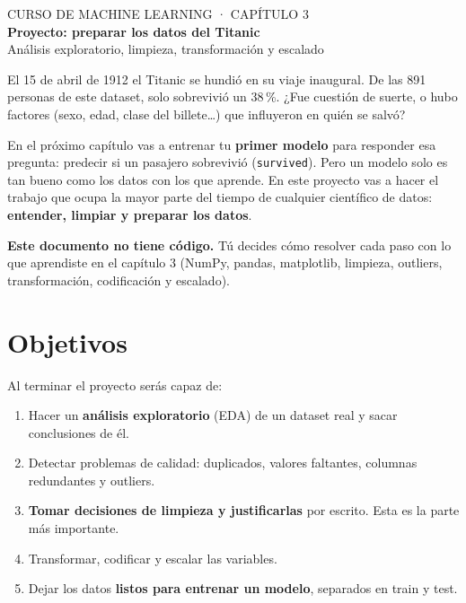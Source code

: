 \documentclass[11pt,a4paper]{article}
\newcommand{\col}[1]{\texttt{#1}}
\begin{document}
\begin{center}
  {\small\color{azul} CURSO DE MACHINE LEARNING · CAPÍTULO 3}\\[4pt]
  {\LARGE\bfseries Proyecto: preparar los datos del Titanic}\\[4pt]
  {\large Análisis exploratorio, limpieza, transformación y escalado}
\end{center}

\vspace{4pt}

El 15 de abril de 1912 el Titanic se hundió en su viaje inaugural. De las 891 personas
de este dataset, solo sobrevivió un 38\,\%. ¿Fue cuestión de suerte, o hubo factores
(sexo, edad, clase del billete\ldots) que influyeron en quién se salvó?

En el próximo capítulo vas a entrenar tu \textbf{primer modelo} para responder esa
pregunta: predecir si un pasajero sobrevivió (\col{survived}). Pero un modelo solo es
tan bueno como los datos con los que aprende. En este proyecto vas a hacer el trabajo
que ocupa la mayor parte del tiempo de cualquier científico de datos:
\textbf{entender, limpiar y preparar los datos}.

\begin{aviso}
\textbf{Este documento no tiene código.} Tú decides cómo resolver cada paso con lo que
aprendiste en el capítulo 3 (NumPy, pandas, matplotlib, limpieza, outliers,
transformación, codificación y escalado).
\end{aviso}

\section*{Objetivos}

Al terminar el proyecto serás capaz de:
\begin{enumerate}
  \item Hacer un \textbf{análisis exploratorio} (EDA) de un dataset real y sacar conclusiones de él.
  \item Detectar problemas de calidad: duplicados, valores faltantes, columnas redundantes y outliers.
  \item \textbf{Tomar decisiones de limpieza y justificarlas} por escrito. Esta es la parte más importante.
  \item Transformar, codificar y escalar las variables.
  \item Dejar los datos \textbf{listos para entrenar un modelo}, separados en train y test.
\end{enumerate}
\end{document}
